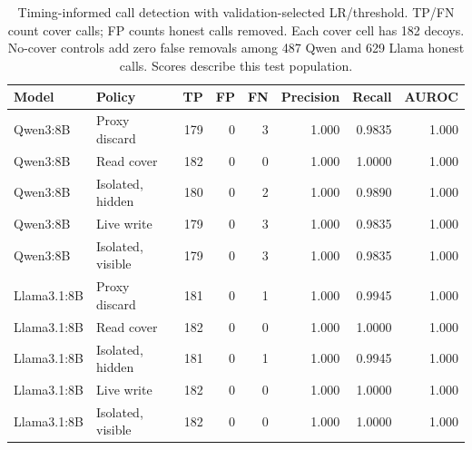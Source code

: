 \begin{table}[t]\centering\small
\caption{Timing-informed call detection with validation-selected LR/threshold. TP/FN count cover calls; FP counts honest calls removed. Each cover cell has 182 decoys. No-cover controls add zero false removals among 487 Qwen and 629 Llama honest calls. Scores describe this test population.}\label{tab:b1-detector}
\setlength{\tabcolsep}{4pt}
\begin{tabularx}{\textwidth}{@{}lYrrrrrr@{}}\toprule
Model & Policy & TP & FP & FN & Precision & Recall & AUROC \\\midrule
Qwen3:8B & Proxy discard & 179 & 0 & 3 & 1.000 & 0.9835 & 1.000 \\
Qwen3:8B & Read cover & 182 & 0 & 0 & 1.000 & 1.0000 & 1.000 \\
Qwen3:8B & Isolated, hidden & 180 & 0 & 2 & 1.000 & 0.9890 & 1.000 \\
Qwen3:8B & Live write & 179 & 0 & 3 & 1.000 & 0.9835 & 1.000 \\
Qwen3:8B & Isolated, visible & 179 & 0 & 3 & 1.000 & 0.9835 & 1.000 \\
Llama3.1:8B & Proxy discard & 181 & 0 & 1 & 1.000 & 0.9945 & 1.000 \\
Llama3.1:8B & Read cover & 182 & 0 & 0 & 1.000 & 1.0000 & 1.000 \\
Llama3.1:8B & Isolated, hidden & 181 & 0 & 1 & 1.000 & 0.9945 & 1.000 \\
Llama3.1:8B & Live write & 182 & 0 & 0 & 1.000 & 1.0000 & 1.000 \\
Llama3.1:8B & Isolated, visible & 182 & 0 & 0 & 1.000 & 1.0000 & 1.000 \\
\bottomrule\end{tabularx}\end{table}
